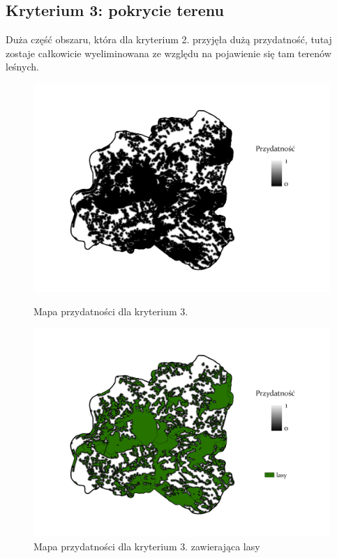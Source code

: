 \documentclass{article}
\begin{document}
\subsection{Kryterium 3: pokrycie terenu}
Duża część obszaru, która dla kryterium 2. przyjęła dużą przydatność, tutaj zostaje całkowicie wyeliminowana ze względu na pojawienie się tam terenów leśnych.

\begin{figure}[H]
    \begin{minipage}[t]{0.48\textwidth}
        \centering
        \includegraphics[width=\linewidth]{img/plesna-kryterium3-layout.jpg}
        \caption{Mapa przydatności dla kryterium 3.}
        \label{fig:kryterium3-layout}
    \end{minipage}
    \hfill
    \begin{minipage}[t]{0.48\textwidth}
        \centering
        \includegraphics[width=\linewidth]{img/plesna-kryterium3-lasy.jpg}
        \caption{Mapa przydatności dla kryterium 3. zawierająca lasy}
        \label{fig:kryterium3-lasy}
    \end{minipage}
\end{figure}
\end{document}
